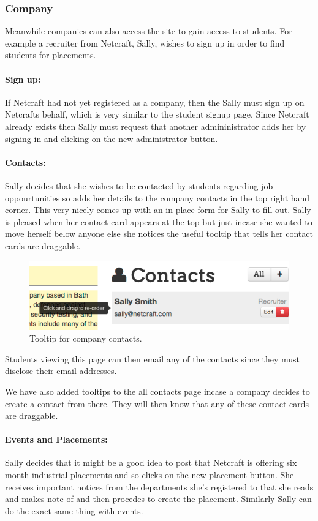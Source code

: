 \subsubsection{Company}
Meanwhile companies can also access the site to gain access to students. For example a recruiter from Netcraft, Sally, wishes to sign up in order to find students for placements.
  \paragraph{Sign up:}
    If Netcraft had not yet registered as a company, then the Sally must sign up on Netcrafts behalf, which is very similar to the student signup page.
    Since Netcraft already exists then Sally must request that another admininistrator adds her by signing in and clicking on the new administrator button.

  \paragraph{Contacts:}
    Sally decides that she wishes to be contacted by students regarding job oppourtunities so adds her details to the company contacts in the top right hand corner. This very nicely comes up with an in place form for Sally to fill out.
    Sally is pleased when her contact card appears at the top but just incase she wanted to move herself below anyone else she notices the useful tooltip that tells her contact cards are draggable.

    \begin{figure}[H]\centering
    \includegraphics[scale=0.5]{images/user_experiences/company/netcraft_company_contact_tooltip}
    \caption{Tooltip for company contacts.}
    \end{figure}
    Students viewing this page can then email any of the contacts since they must disclose their email addresses.

    We have also added tooltips to the all contacts page incase a company decides to create a contact from there. They will then know that any of these contact cards are draggable.

  \paragraph{Events and Placements:}
    Sally decides that it might be a good idea to post that Netcraft is offering six month industrial placements and so clicks on the new placement button. 
    She receives important notices from the departments she's registered to that she reads and makes note of and then procedes to create the placement.
    Similarly Sally can do the exact same thing with events.


